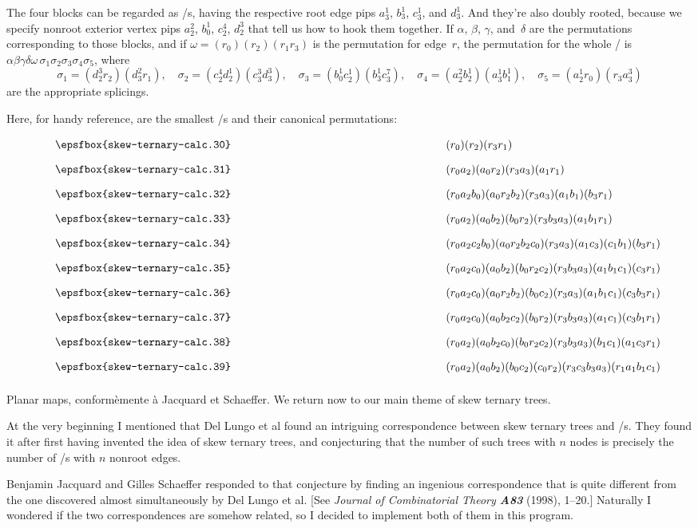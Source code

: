 The four blocks can be regarded as \RNBPM/s, having the respective
root edge pips $a^1_3$, $b^1_3$, $c^1_3$, and $d^1_3$.
And they're also doubly rooted, because we specify nonroot exterior
vertex pips $a^2_2$, $b^1_0$, $c^4_2$, $d^3_2$ that tell us how to
hook them together. If $\alpha$, $\beta$, $\gamma$, and~$\delta$ are
the permutations corresponding to those blocks, and if
$\omega=(r_0)(r_2)(r_1r_3)$ is the permutation for edge~$r$,
the permutation for the
whole \RNBPM/ is
$\alpha\beta\gamma\delta\omega\,\sigma_1\sigma_2\sigma_3\sigma_4\sigma_5$,
where
$$\sigma_1=(d^3_2r_2)(d^2_3r_1),\quad
\sigma_2=(c^4_2d^1_2)(c^3_3d^3_3),\quad
\sigma_3=(b^1_0c^1_2)(b^1_3c^7_3),\quad
\sigma_4=(a^2_2b^1_2)(a^1_3b^1_1),\quad
\sigma_5=(a^1_2r_0)(r_3a^3_3)
$$
are the appropriate splicings.

\fi

Here, for handy reference, are the smallest %
\RNBPM/s and their
canonical permutations:
$$\def\\#1{$\vcenter{\medskip\epsfbox{skew-ternary-calc.3#1}\medskip}$}
\vcenter{\halign{\hfil\\#\hfil&\qquad$#$\hfil\cr
0&(r_0)(r_2)(r_3r_1)\cr
1&(r_0a_2)(a_0r_2)(r_3a_3)(a_1r_1)\cr
2&(r_0a_2b_0)(a_0r_2b_2)(r_3a_3)(a_1b_1)(b_3r_1)\cr
3&(r_0a_2)(a_0b_2)(b_0r_2)(r_3b_3a_3)(a_1b_1r_1)\cr
4&(r_0a_2c_2b_0)(a_0r_2b_2c_0)(r_3a_3)(a_1c_3)(c_1b_1)(b_3r_1)\cr
5&(r_0a_2c_0)(a_0b_2)(b_0r_2c_2)(r_3b_3a_3)(a_1b_1c_1)(c_3r_1)\cr
6&(r_0a_2c_0)(a_0r_2b_2)(b_0c_2)(r_3a_3)(a_1b_1c_1)(c_3b_3r_1)\cr
7&(r_0a_2c_0)(a_0b_2c_2)(b_0r_2)(r_3b_3a_3)(a_1c_1)(c_3b_1r_1)\cr
8&(r_0a_2)(a_0b_2c_0)(b_0r_2c_2)(r_3b_3a_3)(b_1c_1)(a_1c_3r_1)\cr
9&(r_0a_2)(a_0b_2)(b_0c_2)(c_0r_2)(r_3c_3b_3a_3)(r_1a_1b_1c_1)\cr
}}$$

\fi

Planar maps, conform\`emente \`a Jacquard et
Schaeffer.
We return now to our main theme of skew ternary trees.

At the very beginning I mentioned that Del Lungo et al found an
intriguing correspondence between skew ternary trees and \RNBPM/s.
They found it after first having invented the idea of skew ternary
trees, and conjecturing that the number of such trees with $n$ nodes
is precisely the number of \RNBPM/s with $n$ nonroot edges.

Benjamin Jacquard and Gilles Schaeffer responded to that conjecture
by finding an ingenious correspondence that is quite different
from the one discovered almost simultaneously by Del Lungo et al.
[See {\sl Journal of Combinatorial Theory\/ \bf A83}
(1998), 1--20.] Naturally I wondered if the two correspondences are
somehow related, so I decided to implement both of them in this program.

